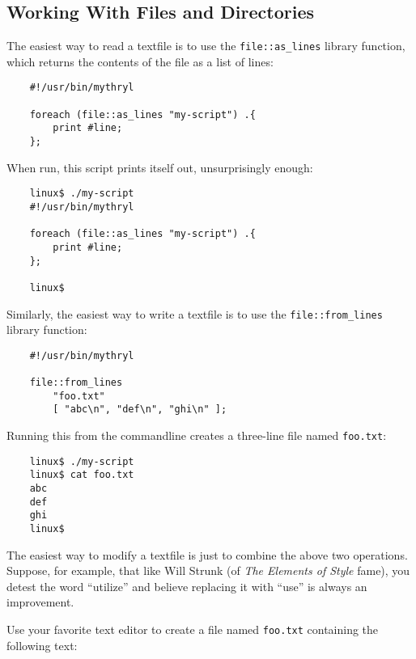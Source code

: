 \cutend*


\subsection{Working With Files and Directories}

The easiest way to read a textfile is to use the {\tt file::as\_lines} 
library function, which returns the contents of the file as a list 
of lines:

\begin{verbatim}
    #!/usr/bin/mythryl

    foreach (file::as_lines "my-script") .{
        print #line;
    };
\end{verbatim}

When run, this script prints itself out, unsurprisingly enough:

\begin{verbatim}
    linux$ ./my-script
    #!/usr/bin/mythryl

    foreach (file::as_lines "my-script") .{
        print #line;
    };

    linux$
\end{verbatim}

Similarly, the easiest way to write a textfile is to use the 
{\tt file::from\_lines} library function:

\begin{verbatim}
    #!/usr/bin/mythryl

    file::from_lines
        "foo.txt"
        [ "abc\n", "def\n", "ghi\n" ];
\end{verbatim}

Running this from the commandline creates a three-line 
file named {\tt foo.txt}:

\begin{verbatim}
    linux$ ./my-script
    linux$ cat foo.txt
    abc
    def
    ghi
    linux$
\end{verbatim}

The easiest way to modify a textfile is just to combine 
the above two operations.  Suppose, for example, that like 
Will Strunk (of {\it The Elements of Style} fame), you 
detest the word ``utilize'' and believe replacing it with 
``use'' is always an improvement.

Use your favorite text editor to create a file named {\tt foo.txt} 
containing the following text:

